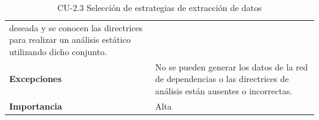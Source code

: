 \begin{table}[p]
\begin{tabularx}{\linewidth}{ p{} p{} }
		deseada y se conocen las directrices para realizar un análisis estático utilizando dicho
		conjunto.                                                                                                                                  \\
		\textbf{Excepciones}          & No se pueden generar los datos de la red de dependencias o las
		directrices de análisis están ausentes o incorrectas.                                                                                      \\
		\textbf{Importancia}          & Alta                                                                                                       \\
		\bottomrule
	\end{tabularx}
	\caption{CU-2.3 Selección de estrategias de extracción de datos}
	\label{tab:cu2.3}
\end{table}



